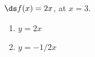 {$\ds f(x) = 2x$, at $x=3$.
}
{\begin{enumerate}
\item		$y = 2x$
\item		$y = -1/2x$
\end{enumerate}
}
